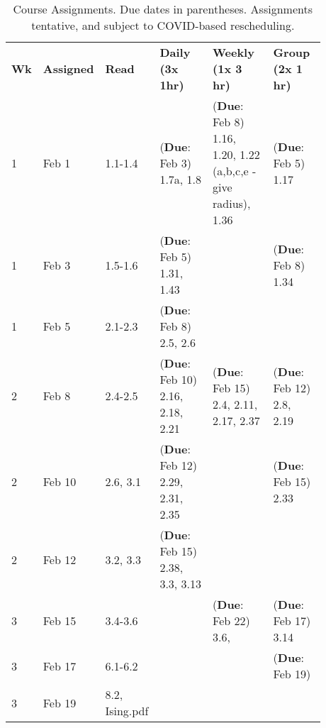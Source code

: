 \documentclass[12pt]{article}
\begin{document}
{\setlength{\arrayrulewidth}{.4mm}
\setlength{\tabcolsep}{8pt}
{
  \begin{table}[]
    \footnotesize
\caption{\footnotesize{Course Assignments. Due dates in parentheses. Assignments tentative, and subject to COVID-based rescheduling.}}
\label{tab:course-assignments}
\begin{tabular}{p{0.03\linewidth}|p{0.08\linewidth}|p{0.065\linewidth}|p{0.25\linewidth}|p{0.25\linewidth}|p{0.2\linewidth}}
\textbf{Wk} & \textbf{Assigned} & \textbf{Read}           & \textbf{Daily (3x 1hr)}            & \textbf{Weekly (1x 3 hr)}                                       & \textbf{Group (2x 1 hr)}    \\
1  & Feb 1    & 1.1-1.4        & (\textbf{Due}: Feb 3) 1.7a, 1.8    & (\textbf{Due}: Feb 8) 1.16, 1.20, 1.22 (a,b,c,e - give radius), 1.36 & (\textbf{Due}: Feb 5) 1.17       \\
1  & Feb 3    & 1.5-1.6        & (\textbf{Due}: Feb 5) 1.31, 1.43        &                                                        & (\textbf{Due}: Feb 8) 1.34       \\
1  & Feb 5    & 2.1-2.3        & (\textbf{Due}: Feb 8) 2.5, 2.6          &                                                        &                    \\
2  & Feb 8    & 2.4-2.5        & (\textbf{Due}: Feb 10) 2.16, 2.18, 2.21 & (\textbf{Due}: Feb 15) 2.4, 2.11, 2.17, 2.37                         & (\textbf{Due}: Feb 12) 2.8, 2.19 \\
2  & Feb 10   & 2.6, 3.1       & (\textbf{Due}: Feb 12) 2.29, 2.31, 2.35 &                                                        & (\textbf{Due}: Feb 15) 2.33      \\
2  & Feb 12   & 3.2, 3.3       & (\textbf{Due}: Feb 15) 2.38, 3.3, 3.13  &                                                        &                    \\
3  & Feb 15   & 3.4-3.6        &                           & (\textbf{Due}: Feb 22) 3.6,                                          & (\textbf{Due}: Feb 17) 3.14      \\
3  & Feb 17   & 6.1-6.2        &                           &                                                        & (\textbf{Due}: Feb 19)           \\
3  & Feb 19   & 8.2, Ising.pdf &                           &                                                        &                    \\

\end{tabular}
\end{table}}}
\end{document}
